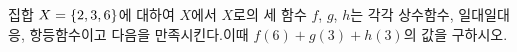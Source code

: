 집합 $X=\{2{,}\mkern3mu\mathopen{}3{,}\mkern3mu\mathopen{}6\}$에 대하여 $X$에서 $X$로의 세 함수 $f$, $g$, $h$는 각각 상수함수, 일대일대응, 항등함수이고 다음을 만족시킨다.이때 $f(6)+g(3)+h(3)$의 값을 구하시오.
